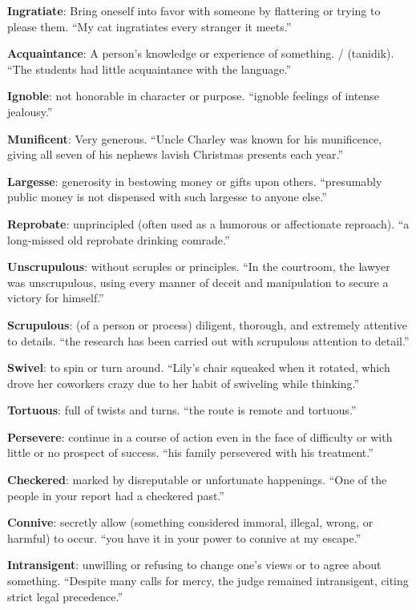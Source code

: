 \documentclass[12pt, a4paper]{ximera}
\begin{document}
\textbf{Ingratiate}: Bring oneself into favor with someone by flattering or trying to please them. ``My cat ingratiates every stranger it meets.''

\textbf{Acquaintance}: A person's knowledge or experience of something. / (tanidik). ``The students had little acquaintance with the language.''

\textbf{Ignoble}: not honorable in character or purpose. ``ignoble feelings of intense jealousy.''

\textbf{Munificent}: Very generous. ``Uncle Charley was known for his munificence, giving all seven of his nephews lavish Christmas presents each year.''

\textbf{Largesse}: generosity in bestowing money or gifts upon others. ``presumably public money is not dispensed with such largesse to anyone else.''

\textbf{Reprobate}: unprincipled (often used as a humorous or affectionate reproach). ``a long-missed old reprobate drinking comrade.''

\textbf{Unscrupulous}:  without scruples or principles. ``In the courtroom, the lawyer was unscrupulous, using every manner of deceit and manipulation to secure a victory for himself.''

\textbf{Scrupulous}: (of a person or process) diligent, thorough, and extremely attentive to details. ``the research has been carried out with scrupulous attention to detail.''

\textbf{Swivel}: to spin or turn around. ``Lily's chair squeaked when it rotated, which drove her coworkers crazy due to her habit of swiveling while thinking.''

\textbf{Tortuous}: full of twists and turns. ``the route is remote and tortuous.''

\textbf{Persevere}: continue in a course of action even in the face of difficulty or with little or no prospect of success. ``his family persevered with his treatment.''

\textbf{Checkered}: marked by disreputable or unfortunate happenings. ``One of the people in your report had a checkered past.''

\textbf{Connive}: secretly allow (something considered immoral, illegal, wrong, or harmful) to occur. ``you have it in your power to connive at my escape.''

\textbf{Intransigent}: unwilling or refusing to change one's views or to agree about something. ``Despite many calls for mercy, the judge remained intransigent, citing strict legal precedence.''
\end{document}
